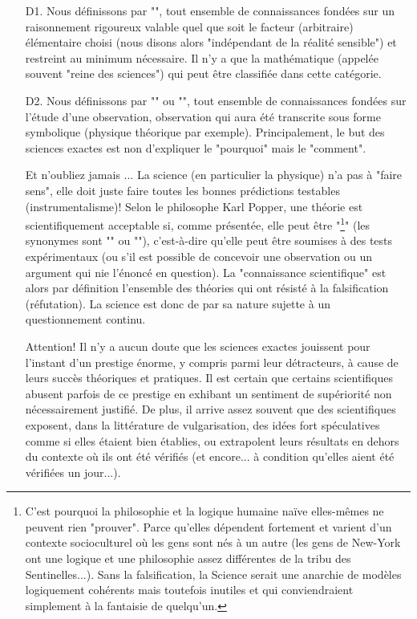 	\begin{itemize}
		\item[D1.] Nous d\'efinissons par "", tout ensemble de connaissances fond\'ees sur un raisonnement rigoureux valable quel que soit le facteur (arbitraire) \'el\'ementaire choisi (nous disons alors "ind\'ependant de la r\'ealit\'e sensible") et restreint au minimum n\'ecessaire. Il n'y a que la math\'ematique (appel\'ee souvent "reine des sciences") qui peut être classifi\'ee dans cette cat\'egorie.
	
		\item[D2.] Nous d\'efinissons par "" ou "", tout ensemble de connaissances fond\'ees sur l'\'etude d'une observation, observation qui aura \'et\'e transcrite sous forme symbolique (physique th\'eorique par exemple). Principalement, le but des sciences exactes est non d'expliquer le "pourquoi" mais le "comment".
		
		Et n'oubliez jamais ... La science (en particulier la physique) n'a pas à "faire sens", elle doit juste faire toutes les bonnes pr\'edictions testables (instrumentalisme)! Selon le philosophe Karl Popper, une th\'eorie est scientifiquement acceptable si, comme pr\'esent\'ee, elle peut être "\footnote{C'est pourquoi la philosophie et la logique humaine naïve elles-mêmes ne peuvent rien "prouver". Parce qu'elles dépendent fortement et varient d'un contexte socioculturel où les gens sont nés à un autre (les gens de New-York ont une logique et une philosophie assez différentes de la tribu des Sentinelles...). Sans la falsification, la Science serait une anarchie de modèles logiquement cohérents mais toutefois inutiles et qui conviendraient simplement à la fantaisie de quelqu'un.}" (les synonymes sont "" ou ""), c'est-à-dire qu'elle peut être soumises à des tests exp\'erimentaux (ou s'il est possible de concevoir une observation ou un argument qui nie l'\'enonc\'e en question). La "connaissance scientifique" est alors par d\'efinition l'ensemble des th\'eories qui ont r\'esist\'e à la falsification (r\'efutation). La science est donc de par sa nature sujette à un questionnement continu.
		
		Attention! Il n'y a aucun doute que les sciences exactes jouissent pour l'instant d'un prestige \'enorme, y compris parmi leur d\'etracteurs, à cause de leurs succès th\'eoriques et pratiques. Il est certain que certains scientifiques abusent parfois de ce prestige en exhibant un sentiment de sup\'eriorit\'e non n\'ecessairement justifi\'e. De plus, il arrive assez souvent que des scientifiques exposent, dans la litt\'erature de vulgarisation, des id\'ees fort sp\'eculatives comme si elles \'etaient bien \'etablies, ou extrapolent leurs r\'esultats en dehors du contexte où ils ont \'et\'e v\'erifi\'es (et encore... à condition qu'elles aient \'et\'e v\'erifi\'ees un jour...).
	

\end{itemize}
